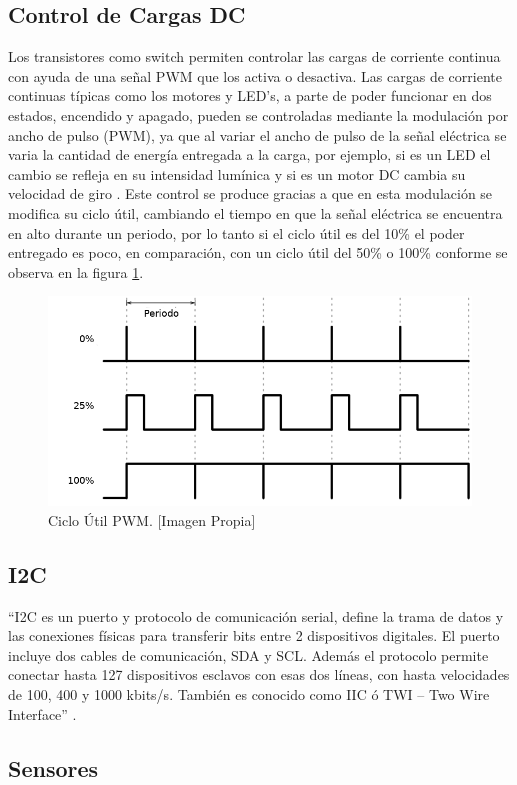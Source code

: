 \subsection{Control de Cargas DC}

Los transistores como switch permiten controlar las cargas de corriente continua con ayuda de una señal PWM que los activa o desactiva. Las cargas de corriente continuas típicas como los motores y LED's, a parte de poder funcionar en dos estados, encendido y apagado, pueden se controladas mediante la modulación por ancho de pulso (PWM), ya que al variar el ancho de pulso de la señal eléctrica se varia la cantidad de energía entregada a la carga, por ejemplo, si es un LED el cambio se refleja en su intensidad lumínica y si es un motor DC cambia su velocidad de giro \cite{PWM}. Este control se produce gracias a que en esta modulación se modifica su ciclo útil, cambiando el tiempo en que la señal eléctrica se encuentra en alto durante un periodo, por lo tanto si el ciclo útil es del 10\% el poder entregado es poco, en comparación, con un ciclo útil del 50\% o 100\% conforme se observa en la figura \ref{fig:pwm-duty-800x396}.

\begin{figure}[H]
	\centering
	\caption{Ciclo Útil PWM. [Imagen Propia] }
	\label{fig:pwm-duty-800x396}
	\includegraphics[width=0.5\linewidth]{Imagenes/pwm}
\end{figure}


\subsection{I2C}

``I2C es un puerto y protocolo de comunicación serial, define la trama de datos y las conexiones físicas para transferir bits entre 2 dispositivos digitales. El puerto incluye dos cables de comunicación, SDA y SCL. Además el protocolo permite conectar hasta 127 dispositivos esclavos con esas dos líneas, con hasta velocidades de 100, 400 y 1000 kbits/s. También es conocido como IIC ó TWI – Two Wire Interface'' \cite{I2C}.

\subsection{Sensores}

